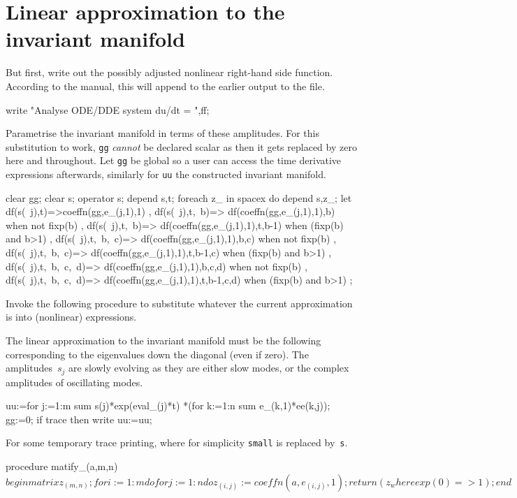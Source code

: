 \documentclass[11pt,a5paper]{article}
\begin{document}
\section{Linear approximation to the invariant manifold}

But first, write out the possibly adjusted nonlinear
right-hand side function. According to the manual, this will
append to the earlier output to the file.
\begin{reduce}
write "Analyse ODE/DDE system du/dt = ",ff;
\end{reduce}

Parametrise the invariant manifold in terms of these
amplitudes. For this substitution to work, \verb|gg|
\emph{cannot} be declared scalar as then it gets replaced by
zero here and throughout.  Let \verb|gg| be global so a user
can access the time derivative expressions afterwards,
similarly for \verb|uu| the constructed invariant manifold.
\begin{reduce}
clear gg;
clear s; operator s; depend s,t;
foreach z_ in spacex do depend s,z_;
let { df(s(~j),t)=>coeffn(gg,e_(j,1),1)
	, df(s(~j),t,~b)=> df(coeffn(gg,e_(j,1),1),b) when not fixp(b)
	, df(s(~j),t,~b)=> df(coeffn(gg,e_(j,1),1),t,b-1) when (fixp(b) and b>1)
	, df(s(~j),t,~b,~c)=> df(coeffn(gg,e_(j,1),1),b,c) when not fixp(b)
	, df(s(~j),t,~b,~c)=> df(coeffn(gg,e_(j,1),1),t,b-1,c) when (fixp(b) and b>1)
	, df(s(~j),t,~b,~c,~d)=> df(coeffn(gg,e_(j,1),1),b,c,d) when not fixp(b)
	, df(s(~j),t,~b,~c,~d)=> df(coeffn(gg,e_(j,1),1),t,b-1,c,d) when (fixp(b) and b>1)
	};
\end{reduce}


Invoke the following procedure to substitute whatever the
current approximation is into (nonlinear) expressions.


The linear approximation to the invariant manifold must be
the following corresponding to the eigenvalues down the
diagonal (even if zero).  The amplitudes~$s_j$ are slowly
evolving as they are either slow modes, or the complex
amplitudes of oscillating modes.
\begin{reduce}
uu:=for j:=1:m sum s(j)*exp(eval_(j)*t)
  *(for k:=1:n sum e_(k,1)*ee(k,j));
gg:=0;
if trace then write uu:=uu;
\end{reduce}

For some temporary trace printing, where for simplicity
\verb|small| is replaced by~\verb|s|.
\begin{reduce}
procedure matify_(a,m,n)$
  begin matrix z_(m,n);
    for i:=1:m do for j:=1:n do z_(i,j):=coeffn(a,e_(i,j),1);
    return (z_ where {exp(0)=>1}); 
    end$
\end{reduce}
\end{document}
